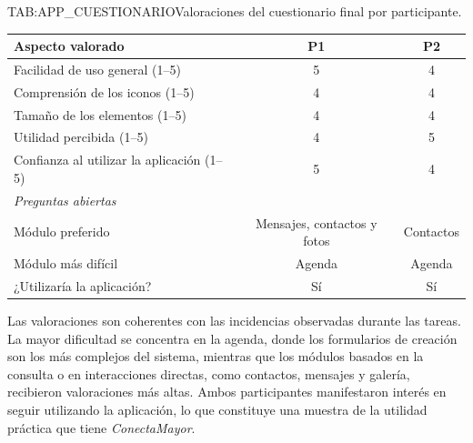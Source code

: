 \begin{table}[Cuestionario final]{TAB:APP_CUESTIONARIO}{Valoraciones
del cuestionario final por participante.}
\begin{center}
\begin{tabular}{p{6cm}cc}
\toprule
\textbf{Aspecto valorado} & \textbf{P1} & \textbf{P2} \\
\midrule
Facilidad de uso general (1--5)       & 5  & 4 \\
Comprensión de los iconos (1--5)      & 4  & 4 \\
Tamaño de los elementos (1--5)        & 4  & 4 \\
Utilidad percibida (1--5)             & 4  & 5 \\
Confianza al utilizar la aplicación (1--5) & 5 & 4 \\
\midrule
\multicolumn{3}{l}{\emph{Preguntas abiertas}} \\
\midrule
Módulo preferido & Mensajes, contactos y fotos & Contactos \\
Módulo más difícil & Agenda & Agenda \\
¿Utilizaría la aplicación? & Sí & Sí \\
\bottomrule
\end{tabular}
\end{center}
\end{table}
\FloatBarrier

Las valoraciones son coherentes con las incidencias observadas durante las tareas. La mayor dificultad se
concentra en la agenda, donde los formularios de creación son los más
complejos del sistema, mientras que los módulos basados en la consulta o en
interacciones directas, como contactos, mensajes y galería, recibieron
valoraciones más altas. Ambos participantes manifestaron interés en seguir
utilizando la aplicación, lo que constituye
una muestra de la utilidad práctica que tiene \emph{ConectaMayor}.